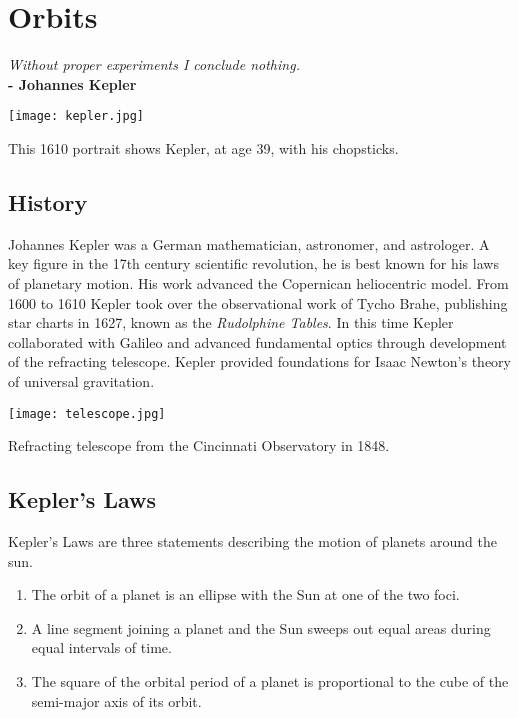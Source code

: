 \chapter{Orbits}

\textit{Without proper experiments I conclude nothing.}\\
\noindent\textbf{-   Johannes Kepler}

\begin{marginfigure}%
  \texttt{[image: kepler.jpg]}
  \caption{This 1610 portrait shows Kepler, at age 39, with his chopsticks.}
  \label{fig:marginfig}
\end{marginfigure}

\section{History}
Johannes Kepler was a German mathematician, astronomer, and astrologer. A key figure in the 17th century scientific revolution, he is best known for his laws of planetary motion.  His work advanced the Copernican heliocentric model.  From 1600 to 1610 Kepler took over the observational work of Tycho Brahe, publishing star charts in 1627, known as the \textit{Rudolphine Tables}.  In this time Kepler collaborated with Galileo and advanced fundamental optics through development of the refracting telescope.  Kepler provided foundations for Isaac Newton's theory of universal gravitation.

\begin{marginfigure}[100pt]
  \texttt{[image: telescope.jpg]}
  \caption{Refracting telescope from the Cincinnati Observatory in 1848.}
  \label{fig:marginfig}
\end{marginfigure}

\section{Kepler's Laws}
Kepler's Laws are three statements describing the motion of planets around the sun.

\begin{enumerate}
\item The orbit of a planet is an ellipse with the Sun at one of the two foci.
\item A line segment joining a planet and the Sun sweeps out equal areas during equal intervals of time.
\item The square of the orbital period of a planet is proportional to the cube of the semi-major axis of its orbit.
\end{enumerate}


